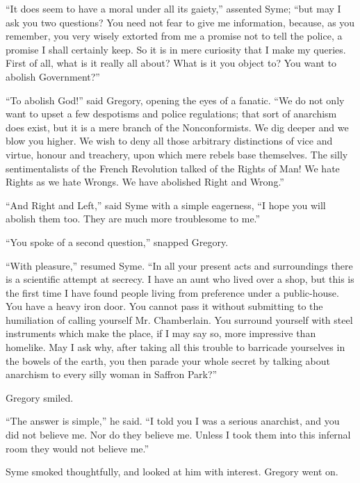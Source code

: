“It does seem to have a moral under all its gaiety,” assented Syme; “but may I ask you two questions? You need not fear to give me information, because, as you remember, you very wisely extorted from me a promise not to tell the police, a promise I shall certainly keep. So it is in mere curiosity that I make my queries. First of all, what is it really all about? What is it you object to? You want to abolish Government?”

“To abolish God!” said Gregory, opening the eyes of a fanatic. “We do not only want to upset a few despotisms and police regulations; that sort of anarchism does exist, but it is a mere branch of the Nonconformists. We dig deeper and we blow you higher. We wish to deny all those arbitrary distinctions of vice and virtue, honour and treachery, upon which mere rebels base themselves. The silly sentimentalists of the French Revolution talked of the Rights of Man! We hate Rights as we hate Wrongs. We have abolished Right and Wrong.”

“And Right and Left,” said Syme with a simple eagerness, “I hope you will abolish them too. They are much more troublesome to me.”

“You spoke of a second question,” snapped Gregory.

“With pleasure,” resumed Syme. “In all your present acts and surroundings there is a scientific attempt at secrecy. I have an aunt who lived over a shop, but this is the first time I have found people living from preference under a public-house. You have a heavy iron door. You cannot pass it without submitting to the humiliation of calling yourself Mr. Chamberlain. You surround yourself with steel instruments which make the place, if I may say so, more impressive than homelike. May I ask why, after taking all this trouble to barricade yourselves in the bowels of the earth, you then parade your whole secret by talking about anarchism to every silly woman in Saffron Park?”

Gregory smiled.

“The answer is simple,” he said. “I told you I was a serious anarchist, and you did not believe me. Nor do they believe me. Unless I took them into this infernal room they would not believe me.”

Syme smoked thoughtfully, and looked at him with interest. Gregory went on.

